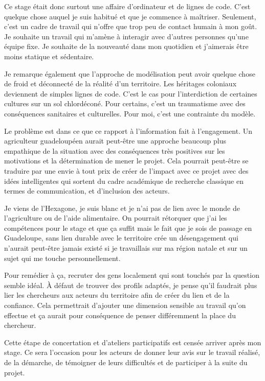 Ce stage était donc surtout une affaire d'ordinateur et de lignes de code. C'est quelque chose
auquel je suis habitué et que je commence à maîtriser. Seulement, c'est un cadre de travail qui
n'offre que trop peu de contact humain à mon goût. Je souhaite un travail qui m'amène à
interagir avec d'autres personnes qu'une équipe fixe. Je souhaite de la nouveauté dans mon
quotidien et j'aimerais être moins statique et sédentaire.

Je remarque également que l'approche de modélisation peut avoir quelque chose de froid et
déconnecté de la réalité d'un territoire. Les héritages coloniaux deviennent de simples lignes
de code. C'est le cas pour l'interdiction de certaines cultures sur un sol chlordéconé. Pour
certains, c'est un traumatisme avec des conséquences sanitaires et culturelles. Pour moi, c'est
une contrainte du modèle.

Le problème est dans ce que ce rapport à l'information fait à l'engagement. Un agriculteur
guadeloupéen aurait peut-être une approche beaucoup plus empathique de la situation avec
des conséquences très positives sur les motivations et la détermination de mener le projet.
Cela pourrait peut-être se traduire par une envie à tout prix de créer de l'impact avec ce
projet avec des idées intelligentes qui sortent du cadre académique de recherche classique en
termes de communication, et d'inclusion des acteurs.

Je viens de l'Hexagone, je suis blanc et je n'ai pas de lien avec le monde de l'agriculture ou
de l'aide alimentaire. On pourrait rétorquer que j'ai les compétences pour le stage et que ça
suffit mais le fait que je sois de passage en Guadeloupe, sans lien durable avec le territoire
crée un désengagement qui n'aurait peut-être jamais existé si je travaillais sur ma région
natale et sur un sujet qui me touche personnellement.

Pour remédier à ça, recruter des gens localement qui sont touchés par la question semble idéal.
À défaut de trouver des profils adaptés, je pense qu'il faudrait plus lier les chercheurs aux
acteurs du territoire afin de créer du lien et de la confiance. Cela permettrait d'ajouter une
dimension sensible au travail qu'on effectue et ça aurait pour conséquence de penser
différemment la place du chercheur.

Cette étape de concertation et d'ateliers participatifs est censée arriver après mon stage. Ce
sera l'occasion pour les acteurs de donner leur avis sur le travail réalisé, de la démarche, de
témoigner de leurs difficultés et de participer à la suite du projet.

